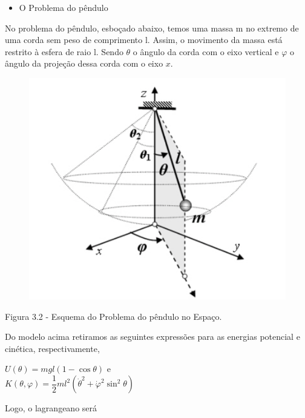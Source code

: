 \documentclass[12pt, a4paper]{article}
\begin{document}
\begin{itemize}
\item O Problema do pêndulo
\end{itemize}

No problema do pêndulo, esboçado abaixo, temos uma massa m no extremo de uma corda sem peso de comprimento l. Assim, o movimento da massa está restrito à esfera de raio l. Sendo $\theta$ o ângulo da corda com o eixo vertical e $\varphi$ o ângulo da projeção dessa corda com o eixo $x$.

\begin{figure}[!h]
    \centering
    \includegraphics[scale=0.6]{imgs/pendulo.PNG}

  \end{figure}
  
\begin{center}
  Figura 3.2 - Esquema do Problema do pêndulo no Espaço.
  \end{center}  
  
Do modelo acima retiramos as seguintes expressões para as energias potencial e cinética, respectivamente,

\begin{center}
$U(\theta) = mgl(1-\cos\theta)$ e\\
$K(\theta, \varphi) = \dfrac{1}{2}ml^2({\dot \theta}^2 + {\dot \varphi}^2 \sin^2 \theta)$
\end{center}
  
Logo, o lagrangeano será
\end{document}

